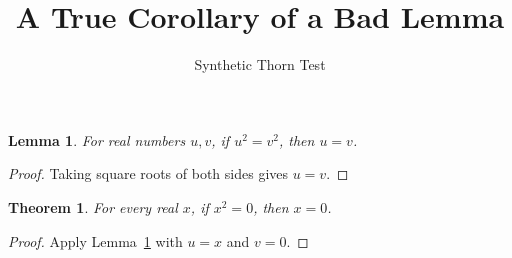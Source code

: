 \documentclass{article}
\newtheorem{lemma}{Lemma}
\newtheorem{theorem}{Theorem}
\begin{document}
\title{A True Corollary of a Bad Lemma}
\author{Synthetic Thorn Test}
\maketitle

\begin{lemma}\label{lem:bad-sign}
For real numbers $u,v$, if $u^2=v^2$, then $u=v$.
\end{lemma}
\begin{proof}
Taking square roots of both sides gives $u=v$.
\end{proof}

\begin{theorem}\label{thm:true-despite-bad-lemma}
For every real $x$, if $x^2=0$, then $x=0$.
\end{theorem}
\begin{proof}
Apply Lemma~\ref{lem:bad-sign} with $u=x$ and $v=0$.
\end{proof}
\end{document}
